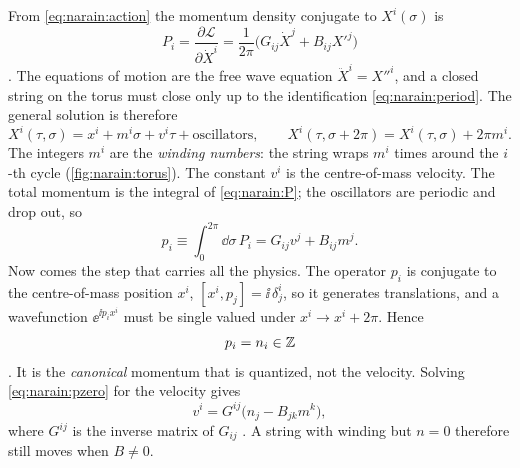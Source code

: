 From \eqref{eq:narain:action} the momentum density conjugate to $X^i(\sigma)$ is
\begin{equation}\label{eq:narain:P}
 P_i=\frac{\partial\mathcal L}{\partial\dot X^i}
 =\frac1{2\pi}\Big(G_{ij}\dot X^j+B_{ij}X'^j\Big)
\end{equation}
. The equations of motion are the free wave
equation $\ddot X^i=X''^i$, and a closed string on the torus must close only up to the
identification \eqref{eq:narain:period}. The general solution is therefore
\begin{equation}\label{eq:narain:modes}
 X^i(\tau,\sigma)=x^i+m^i\sigma+v^i\tau+\text{oscillators},\qquad
 X^i(\tau,\sigma+2\pi)=X^i(\tau,\sigma)+2\pi m^i .
\end{equation}
The integers $m^i$ are the \emph{winding numbers}: the string wraps
$m^i$ times around the $i$-th cycle (\cref{fig:narain:torus}). The constant $v^i$ is the
centre-of-mass velocity. The total momentum is the integral of \eqref{eq:narain:P}; the
oscillators are periodic and drop out, so
\begin{equation}\label{eq:narain:pzero}
 p_i\equiv\int_0^{2\pi}\!\dd\sigma\,P_i=G_{ij}v^j+B_{ij}m^j .
\end{equation}
Now comes the step that carries all the physics. The operator $p_i$ is conjugate to the
centre-of-mass position $x^i$, $[x^i,p_j]=\ii\,\delta^i_j$, so it generates translations, and a
wavefunction $\ee^{\ii p_ix^i}$ must be single valued under $x^i\to x^i+2\pi$. Hence
\begin{equation}\label{eq:narain:nquant}
 p_i=n_i\in\mathbb{Z}
\end{equation}
. It is the \emph{canonical} momentum that is
quantized, not the velocity. Solving \eqref{eq:narain:pzero} for the velocity gives
\begin{equation}\label{eq:narain:velocity}
 v^i=G^{ij}\big(n_j-B_{jk}m^k\big),
\end{equation}
where $G^{ij}$ is the inverse matrix of $G_{ij}$ .
A string with winding but $n=0$ therefore still moves when $B\neq0$.

